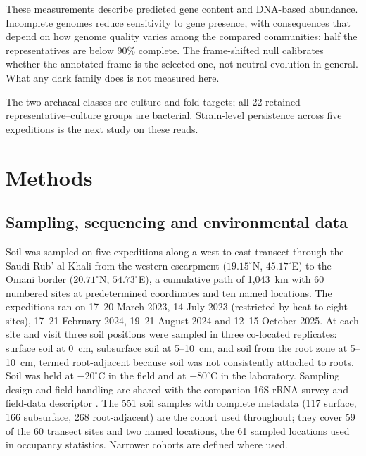 \documentclass[11pt]{article}
\begin{document}
These measurements describe predicted gene content and DNA-based abundance. Incomplete genomes
reduce sensitivity to gene presence, with consequences that depend on how genome quality varies
among the compared communities; half the representatives
are below 90\% complete. The frame-shifted null
calibrates whether the annotated frame is the selected one, not neutral evolution in general. What
any dark family does is not measured here.

The two archaeal classes are culture and fold targets; all 22 retained representative--culture groups are bacterial. Strain-level persistence across five expeditions is the next study on
these reads.

\section*{Methods}

\subsection*{Sampling, sequencing and environmental data}
Soil was sampled on five expeditions along a west to east transect through the Saudi Rub' al-Khali
from the western escarpment ($19.15^\circ$N, $45.17^\circ$E) to the Omani border ($20.71^\circ$N,
$54.73^\circ$E), a cumulative path of 1{,}043~km with 60 numbered sites at predetermined coordinates
and ten named locations. The expeditions ran on 17--20 March 2023, 14 July 2023 (restricted by heat
to eight sites), 17--21 February 2024, 19--21 August 2024 and 12--15 October 2025. At each site and
visit three soil positions were sampled in three co-located replicates: surface soil at 0~cm,
subsurface soil at 5--10~cm, and soil from the root zone at 5--10~cm, termed root-adjacent because
soil was not consistently attached to roots. Soil was held at $-20^\circ$C in the field and at
$-80^\circ$C in the laboratory. Sampling design and field handling are shared with the companion
16S rRNA survey and field-data descriptor \citep{tawfiq2026companion,rubalkhali_datapaper}. The 551 soil samples with complete metadata (117 surface, 166 subsurface, 268 root-adjacent)
are the cohort used throughout; they cover 59 of the 60 transect sites and two named locations, the
61 sampled locations used in occupancy statistics. Narrower cohorts are defined where used.
\end{document}
